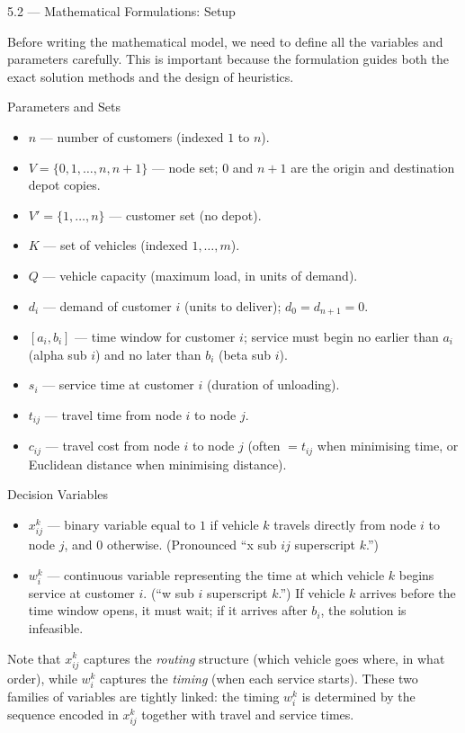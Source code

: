 \documentclass[aspectratio=169,10pt]{beamer}
\begin{document}
\begin{frame}[allowframebreaks]{5.2 --- Mathematical Formulations: Setup}

Before writing the mathematical model, we need to define all the variables and
parameters carefully.  This is important because the formulation guides both the
exact solution methods and the design of heuristics.

\begin{block}{Parameters and Sets}
\begin{itemize}
  \item $n$ \; --- number of customers (indexed $1$ to $n$).
  \item $V = \{0, 1, \ldots, n, n+1\}$ \; --- node set; $0$ and $n+1$ are the
    origin and destination depot copies.
  \item $V' = \{1, \ldots, n\}$ \; --- customer set (no depot).
  \item $K$ \; --- set of vehicles (indexed $1, \ldots, m$).
  \item $Q$ \; --- vehicle capacity (maximum load, in units of demand).
  \item $d_i$ \; --- demand of customer $i$ (units to deliver); $d_0 = d_{n+1} = 0$.
  \item $[a_i, b_i]$ \; --- time window for customer $i$; service must begin no
    earlier than $a_i$ (alpha sub $i$) and no later than $b_i$ (beta sub $i$).
  \item $s_i$ \; --- service time at customer $i$ (duration of unloading).
  \item $t_{ij}$ \; --- travel time from node $i$ to node $j$.
  \item $c_{ij}$ \; --- travel cost from node $i$ to node $j$ (often $= t_{ij}$
    when minimising time, or Euclidean distance when minimising distance).
\end{itemize}
\end{block}

\framebreak

\begin{block}{Decision Variables}
\begin{itemize}
  \item $x_{ij}^k$ \; --- binary variable equal to $1$ if vehicle $k$ travels
    directly from node $i$ to node $j$, and $0$ otherwise.  (Pronounced ``x
    sub $ij$ superscript $k$.'')
  \item $w_i^k$ \; --- continuous variable representing the time at which vehicle
    $k$ begins service at customer $i$.  (``w sub $i$ superscript $k$.'')
    If vehicle $k$ arrives before the time window opens, it must wait; if it
    arrives after $b_i$, the solution is infeasible.
\end{itemize}
\end{block}

\medskip
Note that $x_{ij}^k$ captures the \emph{routing} structure (which vehicle goes
where, in what order), while $w_i^k$ captures the \emph{timing} (when each service
starts).  These two families of variables are tightly linked: the timing $w_i^k$ is
determined by the sequence encoded in $x_{ij}^k$ together with travel and service
times.

\end{frame}
\end{document}
